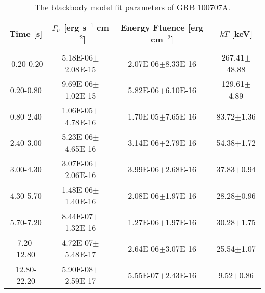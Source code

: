 \begin{table}[h]
\centering
\scriptsize
\label{tab:}
\begin{tabular}{c| c c c}
Time [s] & $F_{\nu}$ [erg s$^{-1}$ cm$^{-2}$] & Energy Fluence [erg cm$^{-2}$] & $kT$ [keV] \\
\hline \hline\\ 

-0.20-0.20 & 5.18E-06$\pm$2.08E-15 & 2.07E-06$\pm$8.33E-16 & 267.41$\pm$48.88 \\ 

0.20-0.80 & 9.69E-06$\pm$1.02E-15 & 5.82E-06$\pm$6.10E-16 & 129.61$\pm$4.89 \\ 

0.80-2.40 & 1.06E-05$\pm$4.78E-16 & 1.70E-05$\pm$7.65E-16 & 83.72$\pm$1.36 \\ 

2.40-3.00 & 5.23E-06$\pm$4.65E-16 & 3.14E-06$\pm$2.79E-16 & 54.38$\pm$1.72 \\ 

3.00-4.30 & 3.07E-06$\pm$2.06E-16 & 3.99E-06$\pm$2.68E-16 & 37.83$\pm$0.94 \\ 

4.30-5.70 & 1.48E-06$\pm$1.40E-16 & 2.08E-06$\pm$1.97E-16 & 28.28$\pm$0.96 \\ 

5.70-7.20 & 8.44E-07$\pm$1.32E-16 & 1.27E-06$\pm$1.97E-16 & 30.28$\pm$1.75 \\ 

7.20-12.80 & 4.72E-07$\pm$5.48E-17 & 2.64E-06$\pm$3.07E-16 & 25.54$\pm$1.07 \\ 

12.80-22.20 & 5.90E-08$\pm$2.59E-17 & 5.55E-07$\pm$2.43E-16 & 9.52$\pm$0.86 \\ 

\end{tabular}
\caption{The blackbody model fit parameters of GRB 100707A.}
\end{table}

